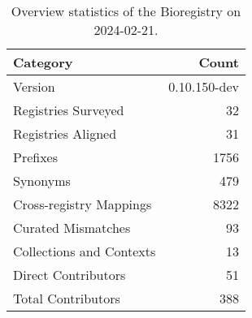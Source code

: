 \begin{table}
\caption{Overview statistics of the Bioregistry on 2024-02-21.}
\label{tab:bioregistry-summary}
\begin{tabular}{lr}
\toprule
Category & Count \\
\midrule
Version & 0.10.150-dev \\
Registries Surveyed & 32 \\
Registries Aligned & 31 \\
Prefixes & 1756 \\
Synonyms & 479 \\
Cross-registry Mappings & 8322 \\
Curated Mismatches & 93 \\
Collections and Contexts & 13 \\
Direct Contributors & 51 \\
Total Contributors & 388 \\
\bottomrule
\end{tabular}
\end{table}
